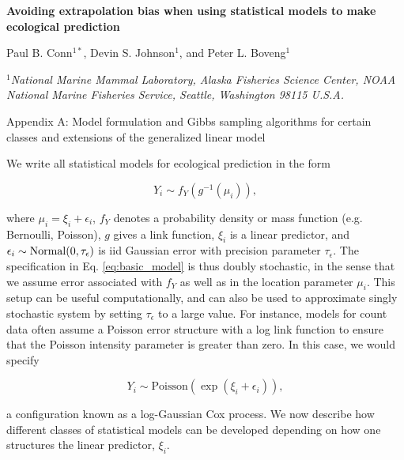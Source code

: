 \documentclass[12pt,fleqn]{article}
\begin{document}
\begin{center} \bf {\large Avoiding extrapolation bias when using statistical models to make ecological prediction}

\vspace{0.7cm}
Paul B. Conn$^{1*}$, Devin S. Johnson$^1$, and Peter L. Boveng$^1$
\end{center}
\vspace{0.5cm}

\rm
\small

\it $^1$National Marine Mammal Laboratory, Alaska Fisheries Science Center,
NOAA National Marine Fisheries Service,
Seattle, Washington 98115 U.S.A.\\

\rm \begin{flushleft}

\raggedbottom
\vspace{.5in}

\begin{center}
Appendix A: Model formulation and Gibbs sampling algorithms for certain classes and extensions of the generalized linear model
\bigskip
\end{center}
\vspace{.3in}

\doublespacing



We write all statistical models for ecological prediction in the form
\begin{linenomath*}
\begin{equation}
  \label{eq:basic_model}
  Y_i \sim f_Y(g^{-1}(\mu_i)),
\end{equation}
\end{linenomath*}
where $\mu_i=\xi_i + \epsilon_i$, $f_Y$ denotes a probability density or mass function (e.g. Bernoulli, Poisson), $g$ gives a link function,
$\xi_i$ is a linear predictor, and $\epsilon_i \sim {\rm Normal}(0,\tau_\epsilon)$ is iid Gaussian error with precision parameter $\tau_\epsilon$.  The specification in Eq. \ref{eq:basic_model} is thus doubly stochastic, in the sense that we assume error associated with $f_Y$ as well as in the location parameter $\mu_i$.  This setup can be useful computationally, and can also be used to approximate singly stochastic system by setting $\tau_\epsilon$ to a large value.  For instance, models for count data often assume a Poisson error structure with a log link function to ensure that the Poisson intensity parameter is greater than zero.  In this case, we would specify
\begin{linenomath*}
\begin{equation*}
  Y_i \sim \mathrm{Poisson}(\exp(\xi_i + \epsilon_i)),
\end{equation*}
\end{linenomath*}
a configuration known as a log-Gaussian Cox process.
We now describe how different classes of statistical models can be developed depending on how one structures the linear predictor, $\xi_i$.


\end{flushleft}
\end{document}

